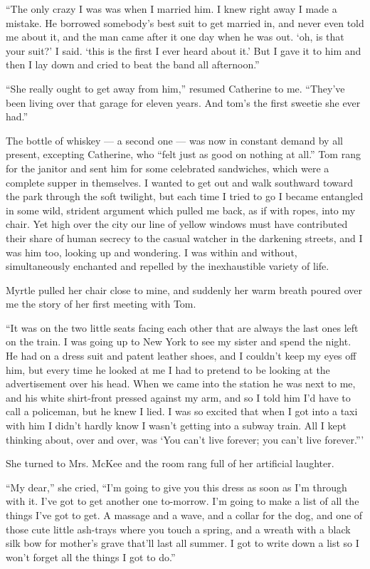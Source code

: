 \documentclass{znotebook}
\begin{document}
``The only crazy I was was when I married him. I knew right away I made a mistake. He borrowed somebody's best suit to get married in, and never even told me about it, and the man came after it one day when he was out. ‘oh, is that your suit?' I said. ‘this is the first I ever heard about it.' But I gave it to him and then I lay down and cried to beat the band all afternoon.''

``She really ought to get away from him,'' resumed Catherine to me. ``They've been living over that garage for eleven years. And tom's the first sweetie she ever had.''

The bottle of whiskey — a second one — was now in constant demand by all present, excepting Catherine, who ``felt just as good on nothing at all.'' Tom rang for the janitor and sent him for some celebrated sandwiches, which were a complete supper in themselves. I wanted to get out and walk southward toward the park through the soft twilight, but each time I tried to go I became entangled in some wild, strident argument which pulled me back, as if with ropes, into my chair. Yet high over the city our line of yellow windows must have contributed their share of human secrecy to the casual watcher in the darkening streets, and I was him too, looking up and wondering. I was within and without, simultaneously enchanted and repelled by the inexhaustible variety of life.

Myrtle pulled her chair close to mine, and suddenly her warm breath poured over me the story of her first meeting with Tom.

``It was on the two little seats facing each other that are always the last ones left on the train. I was going up to New York to see my sister and spend the night. He had on a dress suit and patent leather shoes, and I couldn't keep my eyes off him, but every time he looked at me I had to pretend to be looking at the advertisement over his head. When we came into the station he was next to me, and his white shirt-front pressed against my arm, and so I told him I'd have to call a policeman, but he knew I lied. I was so excited that when I got into a taxi with him I didn't hardly know I wasn't getting into a subway train. All I kept thinking about, over and over, was ‘You can't live forever; you can't live forever.'''

She turned to Mrs. McKee and the room rang full of her artificial laughter.

``My dear,'' she cried, ``I'm going to give you this dress as soon as I'm through with it. I've got to get another one to-morrow. I'm going to make a list of all the things I've got to get. A massage and a wave, and a collar for the dog, and one of those cute little ash-trays where you touch a spring, and a wreath with a black silk bow for mother's grave that'll last all summer. I got to write down a list so I won't forget all the things I got to do.''
\end{document}
